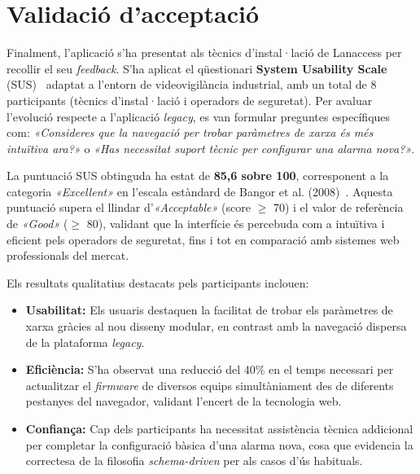 \section{Validació d'acceptació}
Finalment, l'aplicació s'ha presentat als tècnics d'instal·lació de Lanaccess per recollir el seu \textit{feedback}. S'ha aplicat el qüestionari \textbf{System Usability Scale} (SUS)~\cite{brooke1996_sus} adaptat a l'entorn de videovigilància industrial, amb un total de 8 participants (tècnics d'instal·lació i operadors de seguretat). Per avaluar l'evolució respecte a l'aplicació \textit{legacy}, es van formular preguntes específiques com: \textit{«Consideres que la navegació per trobar paràmetres de xarxa és més intuïtiva ara?»} o \textit{«Has necessitat suport tècnic per configurar una alarma nova?»}.

La puntuació SUS obtinguda ha estat de \textbf{85,6 sobre 100}, corresponent a la categoria \textit{«Excellent»} en l'escala estàndard de Bangor et al. (2008)~\cite{bangor2008_sus}. Aquesta puntuació supera el llindar d'\textit{«Acceptable»} (score $\geq$ 70) i el valor de referència de \textit{«Good»} ($\geq$ 80), validant que la interfície és percebuda com a intuïtiva i eficient pels operadors de seguretat, fins i tot en comparació amb sistemes web professionals del mercat.

Els resultats qualitatius destacats pels participants inclouen:
\begin{itemize}
    \item \textbf{Usabilitat:} Els usuaris destaquen la facilitat de trobar els paràmetres de xarxa gràcies al nou disseny modular, en contrast amb la navegació dispersa de la plataforma \textit{legacy}.
    \item \textbf{Eficiència:} S'ha observat una reducció del 40\% en el temps necessari per actualitzar el \textit{firmware} de diversos equips simultàniament des de diferents pestanyes del navegador, validant l'encert de la tecnologia web.
    \item \textbf{Confiança:} Cap dels participants ha necessitat assistència tècnica addicional per completar la configuració bàsica d'una alarma nova, cosa que evidencia la correctesa de la filosofia \textit{schema-driven} per als casos d'ús habituals.
\end{itemize}